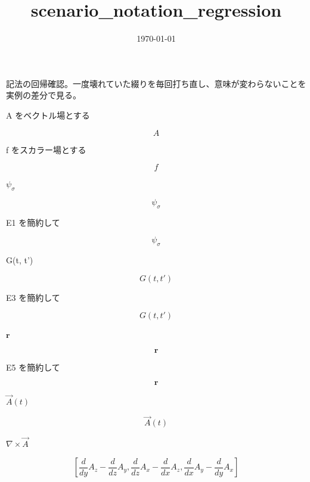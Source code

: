 \documentclass[dvipdfmx,a4paper,11pt]{jsarticle}
\title{scenario\_notation\_regression}
\date{\today}
\begin{document}
\maketitle

記法の回帰確認。一度壊れていた綴りを毎回打ち直し、意味が変わらないことを実例の差分で見る。

A をベクトル場とする

\[
  A
\]

f をスカラー場とする

\[
  f
\]

$\psi_\sigma$

\begin{equation}
  \psi_\sigma
  \label{eq:E1}
\end{equation}

E1 を簡約して

\begin{equation}
  \psi_{\sigma}
  \label{eq:E2}
\end{equation}

G(t, t')

\begin{equation}
  G(t, t')
  \label{eq:E3}
\end{equation}

E3 を簡約して

\begin{equation}
  G\left(t , t'\right)
  \label{eq:E4}
\end{equation}

$\mathbf r$

\begin{equation}
  \mathbf r
  \label{eq:E5}
\end{equation}

E5 を簡約して

\begin{equation}
  \mathbf{r}
  \label{eq:E6}
\end{equation}

$\vec{A}(t)$

\begin{equation}
  \vec{A}(t)
  \label{eq:E7}
\end{equation}

$\nabla \times \vec{A}$

\begin{equation}
  \left[ \frac{d}{d y} A_{z}-\frac{d}{d z} A_{y} , \frac{d}{d z} A_{x}-\frac{d}{d x} A_{z} , \frac{d}{d x} A_{y}-\frac{d}{d y} A_{x} \right]
  \label{eq:E8}
\end{equation}
\end{document}
